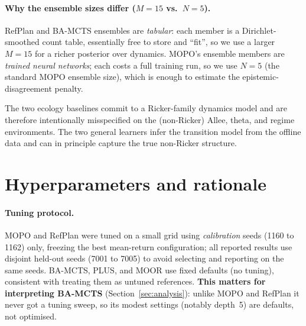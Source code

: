 \documentclass[11pt]{article}
\begin{document}
\paragraph{Why the ensemble sizes differ ($M{=}15$ vs.\ $N{=}5$).} RefPlan and BA-MCTS
ensembles are \emph{tabular}: each member is a Dirichlet-smoothed count table, essentially
free to store and ``fit'', so we use a larger $M{=}15$ for a richer posterior over
dynamics. MOPO's ensemble members are \emph{trained neural networks}; each costs a full
training run, so we use $N{=}5$ (the standard MOPO ensemble size), which is enough to
estimate the epistemic-disagreement penalty.

The two ecology baselines commit to a Ricker-family dynamics model and are therefore
intentionally misspecified on the (non-Ricker) Allee, theta, and regime environments. The
two general learners infer the transition model from the offline data and can in
principle capture the true non-Ricker structure.

\section{Hyperparameters and rationale}
\paragraph{Tuning protocol.} MOPO and RefPlan were tuned on a small grid using
\emph{calibration} seeds (1160 to 1162) only, freezing the best mean-return
configuration; all reported results use disjoint held-out seeds (7001 to 7005) to avoid
selecting and reporting on the same seeds. BA-MCTS, PLUS, and MOOR use fixed defaults (no
tuning), consistent with treating them as untuned references. \textbf{This matters for
interpreting BA-MCTS} (Section~\ref{sec:analysis}): unlike MOPO and RefPlan it never got a
tuning sweep, so its modest settings (notably depth~5) are defaults, not optimised.
\end{document}
